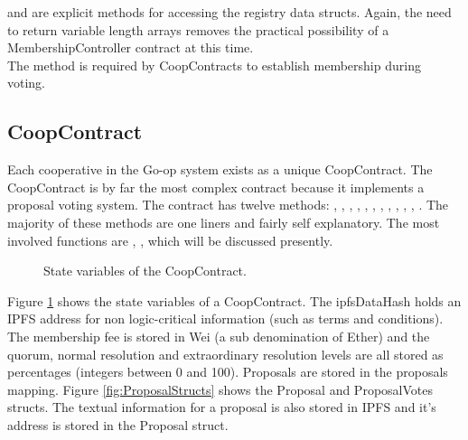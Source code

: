  and  are explicit methods for accessing the registry data structs. Again, the need to return variable length arrays removes the practical possibility of a MembershipController contract at this time. \\

The  method is required by CoopContracts to establish membership during voting.\\

\subsection{CoopContract}
Each cooperative in the Go-op system exists as a unique CoopContract. The CoopContract is by far the most complex contract because it implements a proposal voting system. The  contract has twelve methods: , , , , , , , , , , , . The majority of these methods are one liners and fairly self explanatory. The most involved functions are , ,  which will be discussed presently.\\
\begin{figure}
\centering
{}
\decoRule
\caption[State Variables ofCoopContract]{State variables of the CoopContract.}
\label{fig:CoopState}
\end{figure}

Figure \ref{fig:CoopState} shows the state variables of a CoopContract. The ipfsDataHash holds an IPFS address for non logic-critical information (such as terms and conditions). The membership fee is stored in Wei (a sub denomination of Ether) and the quorum, normal resolution and extraordinary resolution levels are all stored as percentages (integers between 0 and 100). Proposals are stored in the proposals mapping. Figure \ref{fig:ProposalStructs} shows the Proposal and ProposalVotes structs. The textual information for a proposal is also stored in IPFS and it's address is stored in the Proposal struct.\\

